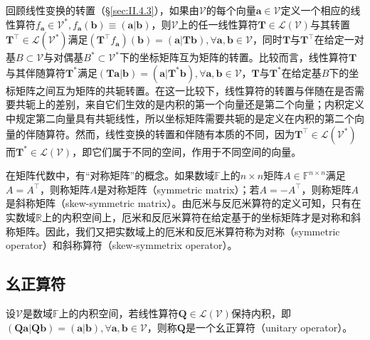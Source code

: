 \documentclass[main.tex]{subfiles}
\begin{document}
回顾线性变换的转置（\S\ref{sec:II.4.3}），如果由$\mathcal{V}$的每个向量$\mathbf{a}\in\mathcal{V}$定义一个相应的线性算符$f_\mathbf{a}\in\mathcal{V}^*,f_\mathbf{a}\left(\mathbf{b}\right)\equiv\left(\mathbf{a}|\mathbf{b}\right)$，则$\mathcal{V}$上的任一线性算符$\mathbf{T}\in\mathcal{L}\left(\mathcal{V}\right)$与其转置$\mathbf{T}^\intercal\in\mathcal{L}\left(\mathcal{V}^*\right)$满足$\left(\mathbf{T}^\intercal f_\mathbf{a}\right)\left(\mathbf{b}\right)=\left(\mathbf{a}|\mathbf{Tb}\right),\forall\mathbf{a},\mathbf{b}\in\mathcal{V}$，同时$\mathbf{T}$与$\mathbf{T}^\intercal$在给定一对基$B\subset\mathcal{V}$与对偶基$B^*\subset\mathcal{V}^*$下的坐标矩阵互为矩阵的转置。比较而言，线性算符$\mathbf{T}$与其伴随算符$\mathbf{T}^*$满足$\left(\mathbf{Ta}|\mathbf{b}\right)=\left(\mathbf{a}|\mathbf{T}^*\mathbf{b}\right),\forall\mathbf{a},\mathbf{b}\in\mathcal{V}$，$\mathbf{T}$与$\mathbf{T}^*$在给定基$B$下的坐标矩阵之间互为矩阵的共轭转置。在这一比较下，线性算符的转置与伴随在是否需要共轭上的差别，来自它们生效的是内积的第一个向量还是第二个向量；内积定义中规定第二向量具有共轭线性，所以坐标矩阵需要共轭的是定义在内积的第二个向量的伴随算符。然而，线性变换的转置和伴随有本质的不同，因为$\mathbf{T}^\intercal\in\mathcal{L}\left(\mathcal{V}^*\right)$而$\mathbf{T}^*\in\mathcal{L}\left(\mathcal{V}\right)$，即它们属于不同的空间，作用于不同空间的向量。

在矩阵代数中，有“对称矩阵”的概念。如果数域$\mathbb{F}$上的$n\times n$矩阵$A\in\mathbb{F}^{n\times n}$满足$A=A^\intercal$，则称矩阵$A$是对称矩阵（symmetric matrix）；若$A=-A^\intercal$，则称矩阵$A$是斜称矩阵（skew-symmetric matrix）。由厄米与反厄米算符的定义可知，只有在实数域$\mathbb{R}$上的内积空间上，厄米和反厄米算符在给定基于的坐标矩阵才是对称和斜称矩阵。因此，我们又把实数域上的厄米和反厄米算符称为对称（symmetric operator）和斜称算符（skew-symmetrix operator）。
                                           
\subsection{幺正算符}

\begin{definition}[幺正算符]\label{def:II.6.2}
设$\mathcal{V}$是数域$\mathbb{F}$上的内积空间，若线性算符$\mathbf{Q}\in\mathcal{L}\left(\mathcal{V}\right)$保持内积，即$\left(\mathbf{Qa}|\mathbf{Qb}\right)=\left(\mathbf{a}|\mathbf{b}\right),\forall\mathbf{a},\mathbf{b}\in\mathcal{V}$，则称$\mathbf{Q}$是一个幺正算符（unitary operator）。
\end{definition}
\end{document}
